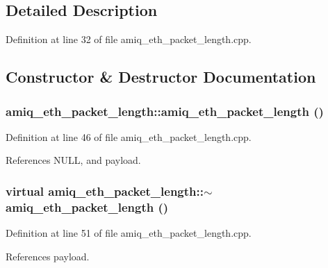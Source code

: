 \subsection{Detailed Description}


Definition at line 32 of file amiq\_\-eth\_\-packet\_\-length.cpp.

\subsection{Constructor \& Destructor Documentation}
\hypertarget{classamiq__eth__packet__length_a7967fef155cea572ef45f46baaa2e9a4}{
\subsubsection[{amiq\_\-eth\_\-packet\_\-length}]{\setlength{\rightskip}{0pt plus 5cm}amiq\_\-eth\_\-packet\_\-length::amiq\_\-eth\_\-packet\_\-length ()}}
\label{classamiq__eth__packet__length_a7967fef155cea572ef45f46baaa2e9a4}


Definition at line 46 of file amiq\_\-eth\_\-packet\_\-length.cpp.

References NULL, and payload.\hypertarget{classamiq__eth__packet__length_aa58226b9a57fb5a13ed5914686d2e5c1}{
\subsubsection[{$\sim$amiq\_\-eth\_\-packet\_\-length}]{\setlength{\rightskip}{0pt plus 5cm}virtual amiq\_\-eth\_\-packet\_\-length::$\sim$amiq\_\-eth\_\-packet\_\-length ()}}
\label{classamiq__eth__packet__length_aa58226b9a57fb5a13ed5914686d2e5c1}


Definition at line 51 of file amiq\_\-eth\_\-packet\_\-length.cpp.

References payload.

